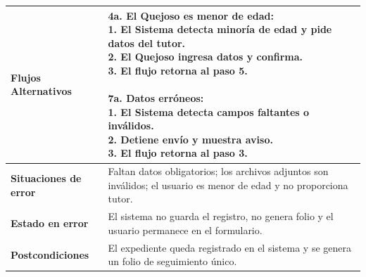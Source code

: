 \begin{longtable}{|p{3.5cm}|p{2cm}|p{2.5cm}|p{7cm}|}
\textbf{Flujos Alternativos} & \multicolumn{3}{p{11.5cm}|}{\textbf{4a. El Quejoso es menor de edad:}\newline 1. El Sistema detecta minoría de edad y pide datos del tutor.\newline 2. El Quejoso ingresa datos y confirma.\newline 3. El flujo retorna al paso 5.\newline\newline \textbf{7a. Datos erróneos:}\newline 1. El Sistema detecta campos faltantes o inválidos.\newline 2. Detiene envío y muestra aviso.\newline 3. El flujo retorna al paso 3.} \\ \hline
\textbf{Situaciones de error} & \multicolumn{3}{p{11.5cm}|}{Faltan datos obligatorios; los archivos adjuntos son inválidos; el usuario es menor de edad y no proporciona tutor.} \\ \hline
\textbf{Estado en error} & \multicolumn{3}{p{11.5cm}|}{El sistema no guarda el registro, no genera folio y el usuario permanece en el formulario.} \\ \hline
\textbf{Postcondiciones} & \multicolumn{3}{p{11.5cm}|}{El expediente queda registrado en el sistema y se genera un folio de seguimiento único.} \\ \hline
\end{longtable}
\endgroup

\vspace{0.8cm}

